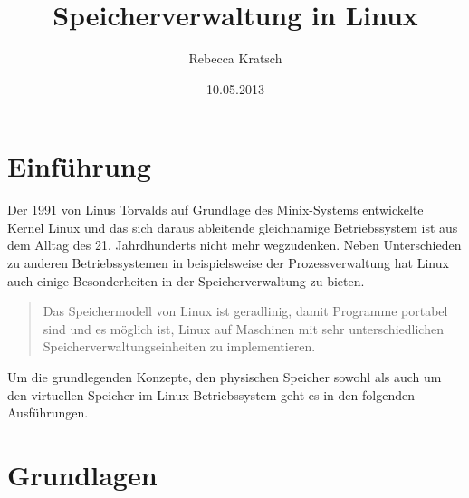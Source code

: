 \documentclass[11pt,a4paper]{article}
\title{Speicherverwaltung in Linux}
\author{Rebecca Kratsch}
\date{10.05.2013}
\begin{document}
\maketitle

\section*{Einführung}
Der 1991 von Linus Torvalds auf Grundlage des Minix-Systems entwickelte Kernel Linux und das sich daraus ableitende gleichnamige Betriebssystem ist aus dem Alltag des 21. Jahrdhunderts nicht mehr wegzudenken. Neben Unterschieden zu anderen Betriebssystemen in beispielsweise der Prozessverwaltung hat Linux auch einige Besonderheiten in der Speicherverwaltung zu bieten.

\begin{quote} \glqq Das Speichermodell von Linux ist geradlinig, damit Programme portabel sind und es möglich ist, Linux auf Maschinen mit sehr unterschiedlichen Speicherverwaltungseinheiten zu implementieren.\grqq 
\end{quote}
Um die grundlegenden Konzepte, den physischen Speicher sowohl als auch um den virtuellen Speicher im Linux-Betriebssystem geht es in den folgenden Ausführungen. 

\section*{Grundlagen}
\end{document}
